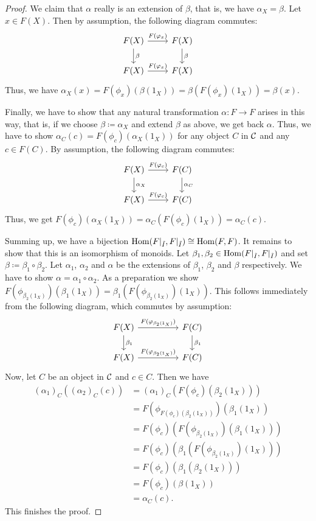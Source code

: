 \begin{proof}
We claim that $\alpha$ really is an extension of $\beta$, that is, we have $\alpha_X = \beta$. Let $x \in F(X)$. Then by assumption, the following diagram commutes:
\[
\begin{tikzcd}
F(X) \arrow[r, "F(\phi_x)"] \arrow[d, "\beta"] & F(X) \arrow[d, "\beta"] \\
F(X) \arrow[r, "F(\phi_x)"]                    & F(X)                   
\end{tikzcd}
\]
Thus, we have $\alpha_X(x) = F(\phi_x)(\beta(1_X)) = \beta(F(\phi_x)(1_X)) = \beta(x)$.

Finally, we have to show that any natural transformation $\alpha\colon F \to F$ arises in this way, that is, if we choose $\beta \coloneqq \alpha_X$ and extend $\beta$ as above, we get back $\alpha$. Thus, we have to show $\alpha_C(c) = F(\phi_c)(\alpha_X(1_X))$ for any object $C$ in $\mathcal{C}$ and any $c \in F(C)$. By assumption, the following diagram commutes:
\[
\begin{tikzcd}
F(X) \arrow[r, "F(\phi_c)"] \arrow[d, "\alpha_X"] & F(C) \arrow[d, "\alpha_C"] \\
F(X) \arrow[r, "F(\phi_c)"]                       & F(C)                      
\end{tikzcd}
\]
Thus, we get $F(\phi_c)(\alpha_X(1_X)) = \alpha_C(F(\phi_c)(1_X)) = \alpha_C(c)$.

Summing up, we have a bijection $\operatorname{Hom}(F\vert_{\tilde I},F\vert_{\tilde I}) \cong \operatorname{Hom}(F,F)$. It remains to show that this is an isomorphism of monoids. Let $\beta_1,\beta_2 \in \operatorname{Hom}(F\vert_{\tilde I},F\vert_{\tilde I})$ and set $\beta \coloneqq \beta_1 \circ \beta_2$. Let $\alpha_1$, $\alpha_2$ and $\alpha$ be the extensions of $\beta_1$, $\beta_2$ and $\beta$ respectively. We have to show $\alpha = \alpha_1 \circ \alpha_2$. As a preparation we show $F(\phi_{\beta_2(1_X)})(\beta_1(1_X)) = \beta_1(F(\phi_{\beta_2(1_X)})(1_X))$. This follows immediately from the following diagram, which commutes by assumption:
\[
\begin{tikzcd}
F(X) \arrow[rr, "F(\phi_{\beta_2(1_X)})"] \arrow[d, "\beta_1"] &  & F(C) \arrow[d, "\beta_1"] \\
F(X) \arrow[rr, "F(\phi_{\beta_2(1_X)})"]                      &  & F(C)                     
\end{tikzcd}
\]
Now, let $C$ be an object in $\mathcal{C}$ and $c \in C$. Then we have
\begin{align*}
(\alpha_1)_C((\alpha_2)_C(c)) &= (\alpha_1)_C(F(\phi_c)(\beta_2(1_X)))\\
&= F(\phi_{F(\phi_c)(\beta_2(1_X))})(\beta_1(1_X))\\
&= F(\phi_c)(F(\phi_{\beta_2(1_X)})(\beta_1(1_X)))\\
&= F(\phi_c)(\beta_1(F(\phi_{\beta_2(1_X)})(1_X)))\\
&= F(\phi_c)(\beta_1(\beta_2(1_X)))\\
&= F(\phi_c)(\beta(1_X))\\
&= \alpha_C(c).
\end{align*}
This finishes the proof.
\end{proof}

